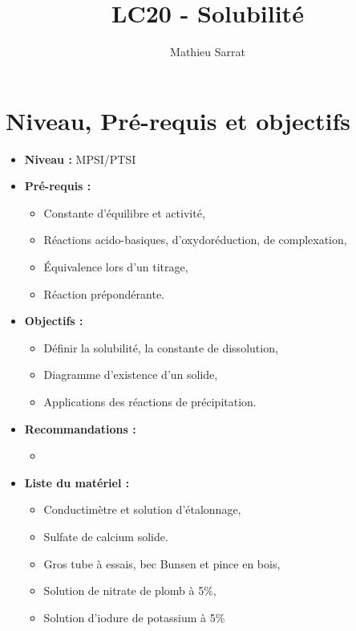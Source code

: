 \documentclass[11pt,a4paper]{report}
\author{Mathieu Sarrat}
\title{LC20 - Solubilité}
\begin{document}
\maketitle

\section*{Niveau, Pré-requis et objectifs}
\begin{itemize}
	\item \textbf{Niveau :} MPSI/PTSI\\
	
	\item \textbf{Pré-requis :}
	\begin{itemize}
		\item Constante d'équilibre et activité,
		\item Réactions acido-basiques, d'oxydoréduction, de complexation,
		\item Équivalence lors d'un titrage,
		\item Réaction prépondérante.\\
	\end{itemize}
	
	\item \textbf{Objectifs :}
	\begin{itemize}
		\item Définir la solubilité, la constante de dissolution,
		\item Diagramme d'existence d'un solide,
		\item Applications des réactions de précipitation.\\
	\end{itemize}
		
	\item \textbf{Recommandations :}
	\begin{itemize}
		\item 
	\end{itemize}
	
	\item \textbf{Liste du matériel :}
	\begin{itemize}
		\item Conductimètre et solution d'étalonnage,
		\item Sulfate de calcium solide.\\
	
		\item Gros tube à essais, bec Bunsen et pince en bois,
		\item Solution de nitrate de plomb à 5\%,
		\item Solution d'iodure de potassium à 5\%\\
		

\end{itemize}
\end{itemize}
\end{document}
